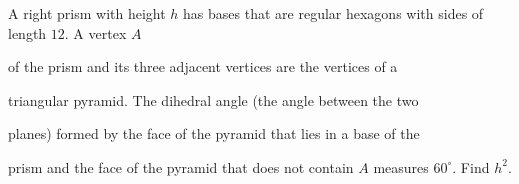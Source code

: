 A right prism with height $h$ has bases that are regular hexagons with sides of length $12$. A vertex $A$

 of the prism and its three adjacent vertices are the vertices of a 

triangular pyramid. The dihedral angle (the angle between the two 

planes) formed by the face of the pyramid that lies in a base of the 

prism and the face of the pyramid that does not contain $A$ measures $60^\circ$. Find $h^2$.